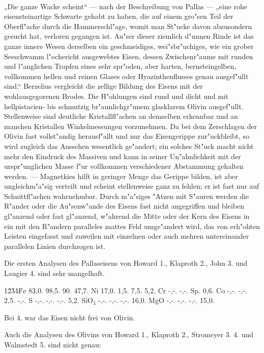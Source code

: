 \documentclass[a4paper, 11pt, oneside]{article}
\begin{document}
\paragraph{}
„Die ganze Wacke scheint“ --- nach der Beschreibung von Pallas --- „eine rohe eisensteinartige Schwarte gehabt zu haben, die auf einem gro"sen Teil der Oberfl"ache durch die Hammerschl"age, womit man St"ucke davon abzusondern gesucht hat, verloren gegangen ist. Au"ser dieser ziemlich d"unnen Rinde ist das ganze innere Wesen derselben ein geschmeidiges, wei"sbr"uchiges, wie ein grober Seeschwamm l"ochericht ausgewebtes Eisen, dessen Zwischenr"aume mit runden und l"anglichen Tropfen eines sehr spr"oden, aber harten, bernsteingelben, vollkommen hellen und reinen Glases oder Hyazinthenflusses genau ausgef"ullt sind.“ Berzelius vergleicht die zellige Bildung des Eisens mit der wohlausgegorenen Brodes. Die H"ohlungen sind rund und dicht und mit hellpistacien- bis schmutzig br"aunlichgr"unem glasklarem Olivin ausgef"ullt. Stellenweise sind deutliche Kristallfl"achen an demselben erkennbar und an manchen Kristallen Winkelmessungen vorzunehmen. Da bei dem Zerschlagen der Olivin fast vollst"andig herausf"allt und nur das Eisengerippe zur"uckbleibt, so wird zugleich das Aussehen wesentlich ge"andert; ein solches St"uck macht nicht mehr den Eindruck des Massiven und kann in seiner Un"ahnlichkeit mit der urspr"unglichen Masse f"ur vollkommen verschiedener Abstammung gehalten werden. --- Magnetkies hilft in geringer Menge das Gerippe bilden, ist aber ungleichm"a"sig verteilt und scheint stellenweise ganz zu fehlen; er ist fast nur auf Schnittfl"achen wahrnehmbar. Durch m"a"siges "Atzen mit S"auren werden die R"ander oder die Au"senw"ande des Eisens fast nicht angegriffen und bleiben gl"anzend oder fast gl"anzend, w"ahrend die Mitte oder der Kern des Eisens in ein mit den R"andern paralleles mattes Feld umge"andert wird, das von erh"ohten Leisten eingefasst und zuweilen mit einzelnen oder auch mehren untereinander parallelen Linien durchzogen ist.

Die ersten Analysen des Pallaseisens von Howard 1., Klaproth 2., John 3. und Laugier 4. sind sehr mangelhaft.

1\. 2\. 3\. 4\.  
Fe 83,0. 98,5. 90. 47,7.  
Ni 17,0. 1,5. 7,5. 5,2.  
Cr -,-. -,-. Sp. 0,6.  
Co -,-. -,-. 2,5. -,-.  
S -,-. -,-. -,-. 5,2.  
SiO$_{3}$ -,-. -,-. -,-. 16,0.  
MgO -,-. -,-. -,-. 15,0.

Bei 4. war das Eisen nicht frei von Olivin.

Auch die Analysen des Olivins von Howard 1., Klaproth 2., Stromeyer 3. 4. und Walmstedt 5. sind nicht genau:
\end{document}
